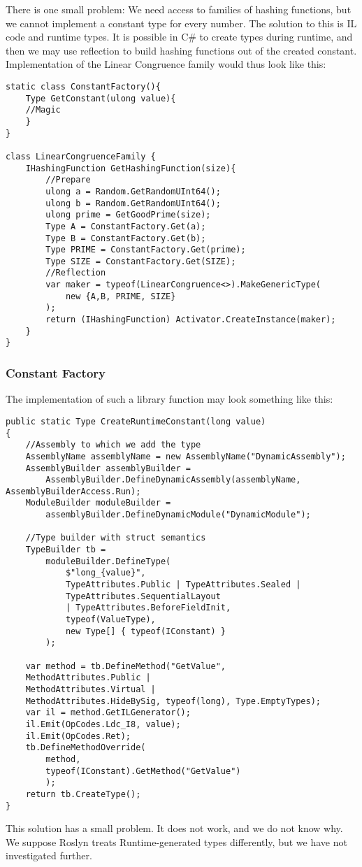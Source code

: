 There is one small problem: We need access to families of hashing functions, but we cannot implement a constant type for every number. The solution to this is IL code and runtime types. It is possible in C\# to create types during runtime, and then we may use reflection to build hashing functions out of the created constant. Implementation of the Linear Congruence family would thus look like this:

\begin{lstlisting}
static class ConstantFactory(){
    Type GetConstant(ulong value){
    //Magic
    }
}

class LinearCongruenceFamily {
    IHashingFunction GetHashingFunction(size){
        //Prepare
        ulong a = Random.GetRandomUInt64();
        ulong b = Random.GetRandomUInt64();
        ulong prime = GetGoodPrime(size);
        Type A = ConstantFactory.Get(a);
        Type B = ConstantFactory.Get(b);
        Type PRIME = ConstantFactory.Get(prime);
        Type SIZE = ConstantFactory.Get(SIZE);
        //Reflection
        var maker = typeof(LinearCongruence<>).MakeGenericType(
            new {A,B, PRIME, SIZE}
        );
        return (IHashingFunction) Activator.CreateInstance(maker);
    }
}
\end{lstlisting}


\subsubsection{Constant Factory}
The implementation of such a library function may look something like this:
\begin{lstlisting}
public static Type CreateRuntimeConstant(long value)
{
    //Assembly to which we add the type
    AssemblyName assemblyName = new AssemblyName("DynamicAssembly");
    AssemblyBuilder assemblyBuilder =
        AssemblyBuilder.DefineDynamicAssembly(assemblyName, AssemblyBuilderAccess.Run);
    ModuleBuilder moduleBuilder =
        assemblyBuilder.DefineDynamicModule("DynamicModule");

    //Type builder with struct semantics
    TypeBuilder tb = 
        moduleBuilder.DefineType(
            $"long_{value}",
            TypeAttributes.Public | TypeAttributes.Sealed | 
            TypeAttributes.SequentialLayout 
            | TypeAttributes.BeforeFieldInit,
            typeof(ValueType),
            new Type[] { typeof(IConstant) }
        );
    
    var method = tb.DefineMethod("GetValue", 
    MethodAttributes.Public | 
    MethodAttributes.Virtual | 
    MethodAttributes.HideBySig, typeof(long), Type.EmptyTypes);
    var il = method.GetILGenerator();
    il.Emit(OpCodes.Ldc_I8, value);
    il.Emit(OpCodes.Ret);
    tb.DefineMethodOverride(
        method,
        typeof(IConstant).GetMethod("GetValue")
        );
    return tb.CreateType();
} 
\end{lstlisting}
This solution has a small problem. It does not work, and we do not know why. We suppose Roslyn treats Runtime-generated types differently, but we have not investigated further.


